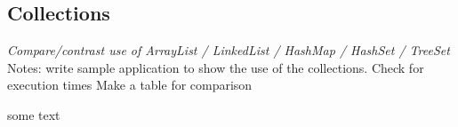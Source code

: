 \subsection{Collections}
\textit{Compare/contrast use of ArrayList / LinkedList / HashMap / HashSet / TreeSet}
Notes: write sample application to show the use of the collections. Check for execution times
Make a table for comparison

some text
